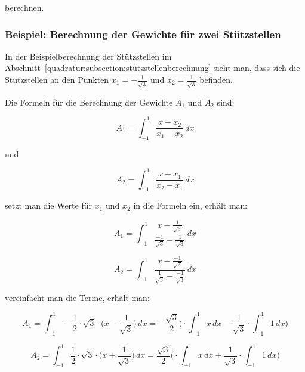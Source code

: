 berechnen.

\subsubsection{Beispiel: Berechnung der Gewichte für zwei Stützstellen}
In der Beispielberechnung der Stützstellen im
Abschnitt~\ref{quadratur:subsection:stützstellenberechnung} sieht man, dass sich die 
Stützstellen an den Punkten $x_{1} = -\frac{1}{\sqrt{3}} $ und $x_{2} = \frac{1}{\sqrt{3}} $ befinden.

Die Formeln für die Berechnung der Gewichte $A_{1}$ und $A_{2}$ sind:

\begin{equation*}
    A_{1} = \int_{-1}^{1} \frac{x - x_{2}}{x_{1} - x_{2}} \, dx
\end{equation*}

und

\begin{equation}
    A_{2} = \int_{-1}^{1} \frac{x - x_{1}}{x_{2} - x_{1}} \, dx
\end{equation}

setzt man die Werte für $x_{1}$ und $x_{2}$ in die Formeln ein, erhält man:

\begin{equation*}
    A_{1} = \int_{-1}^{1} \frac{x - \frac{1}{\sqrt{3}}}{\frac{-1}{\sqrt{3}} - \frac{1}{\sqrt{3}}} \, dx
\end{equation*}

\begin{equation}
    A_{2} = \int_{-1}^{1} \frac{x - \frac{-1}{\sqrt{3}}}{\frac{1}{\sqrt{3}} - \frac{-1}{\sqrt{3}}} \, dx
\end{equation}

vereinfacht man die Terme, erhält man:

\begin{equation*}
    A_{1} 
    =
    \int_{-1}^{1} -\frac{1}{2} 
    \cdot \sqrt{3} 
    \cdot \bigg(x - \frac{1}{\sqrt{3}}\bigg)
    \, dx
    =
    -\frac{\sqrt{3}}{2} 
    \bigg(
    \cdot \int_{-1}^{1}x\,dx
    -
    \frac{1}{\sqrt{3}} 
    \cdot \int_{-1}^{1}1\,dx
    \bigg)
\end{equation*}

\begin{equation}
    A_{2} 
    =
    \int_{-1}^{1} \frac{1}{2} 
    \cdot \sqrt{3}  
    \cdot \bigg(x + \frac{1}{\sqrt{3}}\bigg)
    \, dx
    =
    \frac{\sqrt{3}}{2} 
    \bigg(
    \cdot \int_{-1}^{1}x\,dx
    +
    \frac{1}{\sqrt{3}} 
    \cdot \int_{-1}^{1}1\,dx
    \bigg)
\end{equation}

